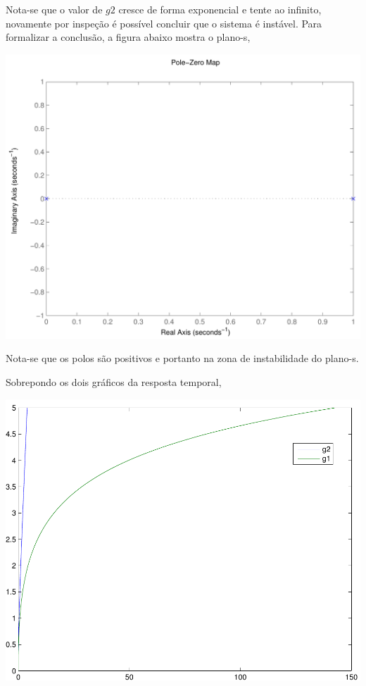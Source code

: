 \documentclass[paper=a4, fontsize=11pt]{article}
\begin{document}
Nota-se que o valor de $g2$ cresce de forma exponencial e tente ao infinito, 
novamente por inspeção é possível concluir que o sistema é instável. Para
formalizar a conclusão, a figura abaixo mostra o plano-s,

\begin{center}
    \includegraphics[scale=.5]{pzq1g2.pdf}
\end{center}

Nota-se que os polos são positivos e portanto na zona de instabilidade do plano-s.

Sobrepondo os dois gráficos da resposta temporal,

\begin{center}
    \includegraphics[scale=.5]{g1g2.pdf}
\end{center}
\end{document}

